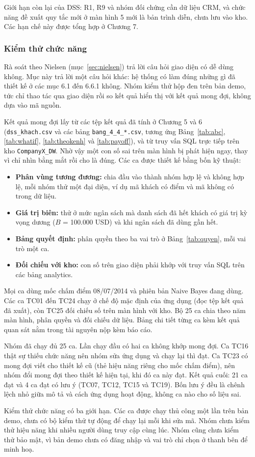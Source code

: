 Giới hạn còn lại của DSS: R1, R9 và nhóm đối chứng cần dữ liệu CRM, và chức năng đề xuất quy tắc mới ở màn hình 5 mới là bản trình diễn, chưa lưu vào kho. Các hạn chế này được tổng hợp ở Chương 7.

\subsubsection{Kiểm thử chức năng}\label{sec:kiemthu}
Rà soát theo Nielsen (mục~\ref{sec:nielsen}) trả lời câu hỏi giao diện có dễ dùng không. Mục này trả lời một câu hỏi khác: hệ thống có làm đúng những gì đã thiết kế ở các mục 6.1 đến 6.6.1 không. Nhóm kiểm thử hộp đen trên bản demo, tức chỉ thao tác qua giao diện rồi so kết quả hiển thị với kết quả mong đợi, không dựa vào mã nguồn.

Kết quả mong đợi lấy từ các tệp kết quả đã tính ở Chương 5 và 6 (\texttt{dss\_khach.csv} và các bảng \texttt{bang\_4\_4\_*.csv}, tương ứng Bảng~\ref{tab:abc}, \ref{tab:whatif}, \ref{tab:theokenh} và \ref{tab:payoff}), và từ truy vấn SQL trực tiếp trên kho \texttt{CompanyX\_DW}. Nhờ vậy một con số sai trên màn hình bị phát hiện ngay, thay vì chỉ nhìn bằng mắt rồi cho là đúng. Các ca được thiết kế bằng bốn kỹ thuật:
\begin{itemize}
    \item \textbf{Phân vùng tương đương:} chia đầu vào thành nhóm hợp lệ và không hợp lệ, mỗi nhóm thử một đại diện, ví dụ mã khách có điểm và mã không có trong dữ liệu.
    \item \textbf{Giá trị biên:} thử ở mức ngân sách mà danh sách đã hết khách có giá trị kỳ vọng dương ($B$ = 100.000 USD) và khi ngân sách đã dùng gần hết.
    \item \textbf{Bảng quyết định:} phân quyền theo ba vai trò ở Bảng~\ref{tab:quyen}, mỗi vai trò một ca.
    \item \textbf{Đối chiếu với kho:} con số trên giao diện phải khớp với truy vấn SQL trên các bảng analytics.
\end{itemize}
Mọi ca dùng mốc chấm điểm 08/07/2014 và phiên bản Naive Bayes đang dùng. Các ca TC01 đến TC24 chạy ở chế độ mặc định của ứng dụng (đọc tệp kết quả đã xuất), còn TC25 đối chiếu số trên màn hình với kho. Bộ 25 ca chia theo năm màn hình, phân quyền và đối chiếu dữ liệu. Bảng chi tiết từng ca kèm kết quả quan sát nằm trong tài nguyên nộp kèm báo cáo.

Nhóm đã chạy đủ 25 ca. Lần chạy đầu có hai ca không khớp mong đợi. Ca TC16 thật sự thiếu chức năng nên nhóm sửa ứng dụng và chạy lại thì đạt. Ca TC23 có mong đợi viết cho thiết kế cũ (thẻ hiệu năng riêng cho mốc chấm điểm), nên nhóm đổi mong đợi theo thiết kế hiện tại, khi đó ca này đạt. Kết quả cuối: 21 ca đạt và 4 ca đạt có lưu ý (TC07, TC12, TC15 và TC19). Bốn lưu ý đều là chênh lệch nhỏ giữa mô tả và cách ứng dụng hoạt động, không ca nào cho số liệu sai.

Kiểm thử chức năng có ba giới hạn. Các ca được chạy thủ công một lần trên bản demo, chưa có bộ kiểm thử tự động để chạy lại mỗi khi sửa mã. Nhóm chưa kiểm thử hiệu năng khi nhiều người dùng truy cập cùng lúc. Nhóm cũng chưa kiểm thử bảo mật, vì bản demo chưa có đăng nhập và vai trò chỉ chọn ở thanh bên để minh hoạ.
